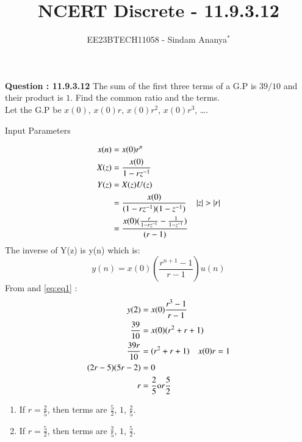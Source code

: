 \documentclass[journal,12pt,twocolumn]{IEEEtran}
\theoremstyle{remark}
\begin{document}

\vspace{3cm}

\title{NCERT Discrete - 11.9.3.12}
\author{EE23BTECH11058 - Sindam Ananya$^{*}$%
}
\maketitle
\newpage
\bigskip

\renewcommand{\thefigure}{\theenumi}
\renewcommand{\thetable}{\theenumi}

\vspace{3cm}
\textbf{Question : 11.9.3.12} 
The sum of the first three terms of a G.P is $39/10$ and their product is $1$. Find the common ratio and the terms.\\
\solution
Let the G.P be $x(0)$, $x(0)r$, $x(0)r^2$, $x(0)r^3$, \ldots.\\
\begin{table}[h!]
    \centering
    
    \caption{Input Parameters}
    \label{tab:table1}
\end{table}
\begin{align}
x(n) &= x(0)r^n \\
X(z) &= \frac{x(0)}{1-rz^{-1}} \\
Y(z) &= X(z)U(z) \\
     &= \frac{x(0)}{(1-rz^{-1})(1-z^{-1})} \quad \left\vert z\right\vert > \left\vert r\right\vert \\
     &= \frac{x(0)(\frac{r}{1-rz^{-1}}-\frac{1}{1-z^{-1}})}{(r-1)}
\end{align}
The inverse of Y(z) is y(n) which is:
\begin{equation}
y(n) = x(0)(\frac{r^{n+1}-1}{r-1})u(n)
\label{eq:eq1}
\end{equation}
From  and \eqref{eq:eq1} :
\begin{align}
y(2) &= x(0)\frac{r^3-1}{r-1}\\
\frac{39}{10} &= x(0)(r^2+r+1)\\
\frac{39r}{10} &= (r^2+r+1) \quad x(0)r = 1\\
(2r-5)(5r-2) &=0\\
r &= \frac{2}{5} \text or \frac{5}{2}
\end{align}
\begin{enumerate}
      \item If $r = \frac{2}{5}$, then terms are $\frac{5}{2}$, $1$, $\frac{2}{5}$.
      \item If $r = \frac{5}{2}$, then terms are $\frac{2}{5}$, $1$, $\frac{5}{2}$.
\end{enumerate}
\end{document}
